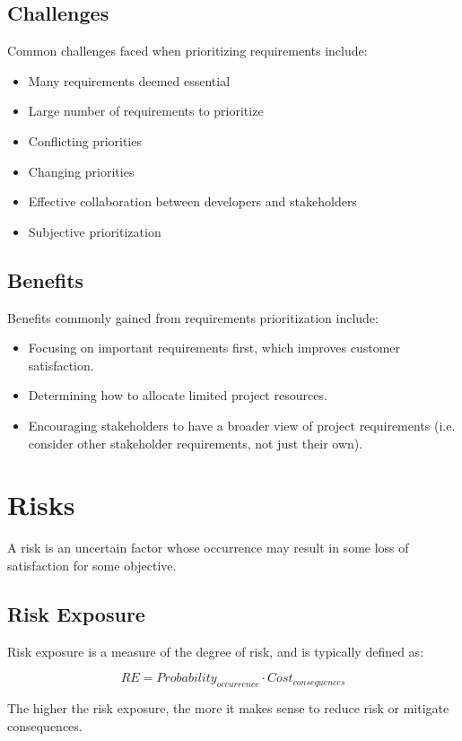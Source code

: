 \documentclass[12pt,titlepage]{article}
\let\stdsection\section
\renewcommand\section{\clearpage\stdsection}
\begin{document}
    \subsection{Challenges}
      Common challenges faced when prioritizing requirements include:
      \begin{itemize}
        \item Many requirements deemed essential
        \item Large number of requirements to prioritize
        \item Conflicting priorities
        \item Changing priorities
        \item Effective collaboration between developers and stakeholders
        \item Subjective prioritization
      \end{itemize}

    \subsection{Benefits}
      Benefits commonly gained from requirements prioritization include:
      \begin{itemize}
        \item Focusing on important requirements first, which improves customer satisfaction.
        \item Determining how to allocate limited project resources.
        \item Encouraging stakeholders to have a broader view of project requirements (i.e. consider other stakeholder requirements, not just their own).
      \end{itemize}

  \section{Risks}
    A risk is an uncertain factor whose occurrence may result in some loss of satisfaction for some objective.

    \subsection{Risk Exposure}
      Risk exposure is a measure of the degree of risk, and is typically defined as:

      $$RE = Probability_{occurrence} \cdot Cost_{consequences}$$

      The higher the risk exposure, the more it makes sense to reduce risk or mitigate consequences.
\end{document}
